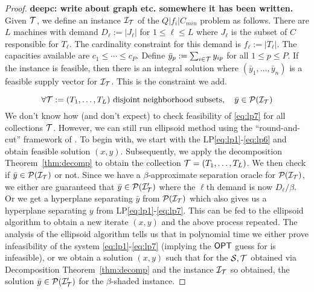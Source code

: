 \begin{proof}{\bf deepc: write about graph etc. somewhere it has been written.}
\def\yy{\bar{y}}
Given ${\cal T}$, we define an instance ${\cal I}_{\cal T}$ of the $Q|f_i|C_{min}$ problem as follows. There are $L$ machines with demand $D_\ell := |J_\ell|$ for $1\leq\ell\leq L$ where $J_\ell$ is the subset of $C$ responsible for $T_\ell$.
The cardinality constraint for this demand is $f_\ell := |T_\ell|$. The capacities available are $c_1\leq \cdots \leq c_P$.
Define  $\yy_p := \sum_{i\in \calT} y_{ip}$ for all $1\le p\le P$. If the \mckc instance is feasible, then there is an integral solution where $(\yy_1,\ldots,\yy_n)$ is a feasible supply vector for ${\cal I}_{\cal T}$.
This is the constraint we add.

\begin{equation}\label{eq:lp7}
\forall \calT := (T_1,\ldots,T_L) \textrm{ disjoint neighborhood subsets}, \quad \yy \in \calP(\calI_\calT)
\end{equation}
\noindent
We don't know how (and don't expect) to check feasibility of  \eqref{eq:lp7} for all collections ${\cal T}$. However, we can still run ellipsoid method using the ``round-and-cut'' framework of \cite{bibid}.
To begin with, we start with the LP\eqref{eq:lp1}-\eqref{eq:lp6} and obtain feasible solution $(x,y)$. Subsequently, we apply the decomposition Theorem~\ref{thm:decomp} to obtain the collection ${\cal T} = (T_1,\ldots,T_L)$.
We then check if $\yy \in \calP(\calI_\calT)$ or not. Since we have a $\beta$-approximate separation oracle for ${\cal P}({\cal I}_{\cal T})$, we either are guaranteed that $\yy \in \calP(\calI'_\calT)$ where the $\ell$th demand is now 
$D_\ell/\beta$. Or we get a hyperplane separating $\yy$ from ${\cal P}({\cal I}_{\cal T})$ which also gives us a
hyperplane separating $y$ from  LP\eqref{eq:lp1}-\eqref{eq:lp7}. This can be fed to the ellipsoid algorithm to obtain a new iterate $(x,y)$ and the above process repeated. The analysis of the ellipsoid algorithm
tells us that in polynomial time we either prove infeasibility of the system \eqref{eq:lp1}-\eqref{eq:lp7} (implying the $\mathsf{OPT}$  guess for \mckc is infeasible), or we obtain a solution  $(x,y)$ such that for the ${\cal S}, {\cal T}$ obtained via Decomposition Theorem~\ref{thm:decomp}
and the instance ${\cal I}_{\cal T}$ so obtained, the solution  $\yy \in \calP(\calI'_\calT)$ for the $\beta$-shaded instance.


\end{proof}
